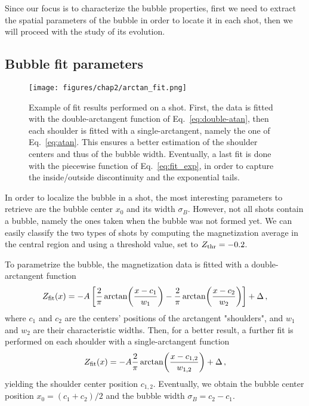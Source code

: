 Since our focus is to characterize the bubble properties, first we need to extract the spatial parameters of the bubble in order to locate it in each shot, then we will proceed with the study of its evolution.

\subsection{Bubble fit parameters}
\begin{figure}[ht!]
    \centering
    \texttt{[image: figures/chap2/arctan\_fit.png]}
    \caption{Example of fit results performed on a shot. First, the data is fitted with the double-arctangent function of Eq.\ \eqref{eq:double-atan}, then each shoulder is fitted with a single-arctangent, namely the one of Eq.\ \eqref{eq:atan}. This ensures a better estimation of the shoulder centers and thus of the bubble width. Eventually, a last fit is done with the piecewise function of Eq.\ \eqref{eq:fit_exp}, in order to capture the inside/outside discontinuity and the exponential tails.}
    \label{fig:atan-fit}
\end{figure}
In order to localize the bubble in a shot, the most interesting parameters to retrieve are the bubble center $x_0$ and its width $\sigma_B$.
However, not all shots contain a bubble, namely the ones taken when the bubble was not formed yet. We can easily classify the two types of shots by computing the magnetization average in the central region and using a threshold value, set to $Z_{\rm thr} = -0.2$. 

To parametrize the bubble, the magnetization data is fitted with a double-arctangent function
\begin{equation}
    Z_{\rm fit}(x) = -A \left[\frac{2}{\pi}\arctan(\frac{x-c_1}{w_1}) - \frac{2}{\pi}\arctan(\frac{x-c_2}{w_2})\right] + \Delta\, ,
    \label{eq:double-atan}
\end{equation}
where $c_1$ and $c_2$ are the centers' positions of the arctangent "shoulders", and $w_1$ and $w_2$ are their characteristic widths. 
Then, for a better result, a further fit is performed on each shoulder with a single-arctangent function
\begin{equation}
    Z_{\rm fit}(x) = -A \frac{2}{\pi}\arctan(\frac{x-c_{1,2}}{w_{1,2}}) + \Delta\, ,
    \label{eq:atan}
\end{equation}
yielding the shoulder center position $c_{1,2}$. Eventually, we obtain the bubble center position $x_0 = (c_1 + c_2)/2$ and the bubble width $\sigma_B = c_2 - c_1$.

